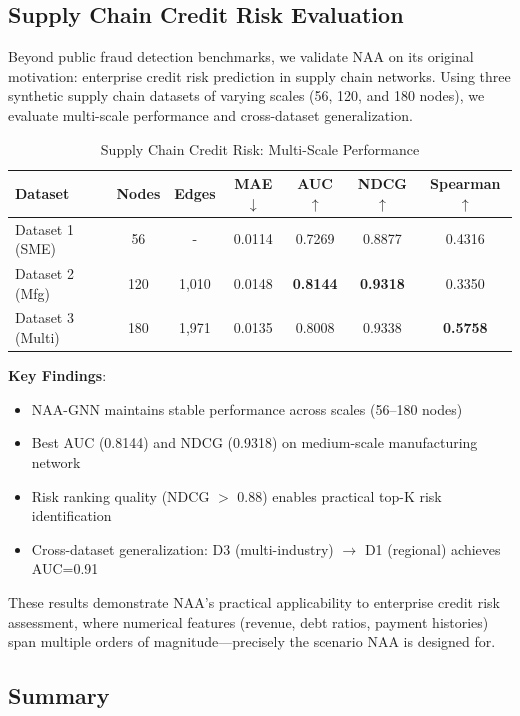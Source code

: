 \subsection{Supply Chain Credit Risk Evaluation}

Beyond public fraud detection benchmarks, we validate NAA on its original motivation: enterprise credit risk prediction in supply chain networks. Using three synthetic supply chain datasets of varying scales (56, 120, and 180 nodes), we evaluate multi-scale performance and cross-dataset generalization.

\begin{table}[t]
\centering
\caption{Supply Chain Credit Risk: Multi-Scale Performance}
\label{tab:supply_chain}
\small
\begin{tabular}{lcccccc}
\toprule
\textbf{Dataset} & \textbf{Nodes} & \textbf{Edges} & \textbf{MAE}$\downarrow$ & \textbf{AUC}$\uparrow$ & \textbf{NDCG}$\uparrow$ & \textbf{Spearman}$\uparrow$ \\
\midrule
Dataset 1 (SME) & 56 & - & 0.0114 & 0.7269 & 0.8877 & 0.4316 \\
Dataset 2 (Mfg) & 120 & 1,010 & 0.0148 & \textbf{0.8144} & \textbf{0.9318} & 0.3350 \\
Dataset 3 (Multi) & 180 & 1,971 & 0.0135 & 0.8008 & 0.9338 & \textbf{0.5758} \\
\bottomrule
\end{tabular}
\end{table}

\textbf{Key Findings}:
\begin{itemize}
\item NAA-GNN maintains stable performance across scales (56--180 nodes)
\item Best AUC (0.8144) and NDCG (0.9318) on medium-scale manufacturing network
\item Risk ranking quality (NDCG $>$ 0.88) enables practical top-K risk identification
\item Cross-dataset generalization: D3 (multi-industry) $\to$ D1 (regional) achieves AUC=0.91
\end{itemize}

These results demonstrate NAA's practical applicability to enterprise credit risk assessment, where numerical features (revenue, debt ratios, payment histories) span multiple orders of magnitude---precisely the scenario NAA is designed for.

\subsection{Summary}

